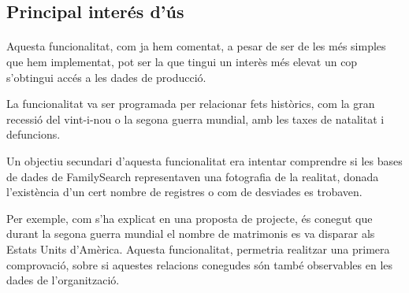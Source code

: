 \subsection{Principal interés d'ús}

    \paragraph{}
    Aquesta funcionalitat, com ja hem comentat, a pesar de ser de les més simples que hem implementat, pot ser la que tingui un interès més elevat un cop s'obtingui accés a les dades de producció.

    La funcionalitat va ser programada per relacionar fets històrics, com la gran recessió del vint-i-nou o la segona guerra mundial, amb les taxes de natalitat i defuncions.

    Un objectiu secundari d'aquesta funcionalitat era intentar comprendre si les bases de dades de FamilySearch representaven una fotografia de la realitat, donada l'existència d'un cert nombre de registres o com de desviades es trobaven.

    Per exemple,  com s’ha explicat en una proposta de projecte, és conegut que durant la segona guerra mundial el nombre de matrimonis es va disparar als Estats Units d'Amèrica. Aquesta funcionalitat, permetria realitzar una primera comprovació, sobre si aquestes relacions conegudes són també observables en les dades de l'organització.
